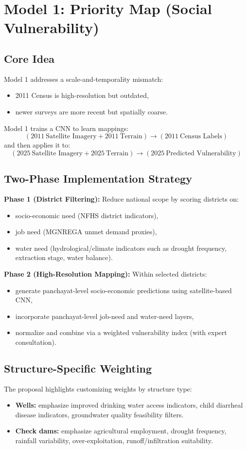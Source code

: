 \documentclass[12pt,a4paper]{report}
\begin{document}
\section{Model 1: Priority Map (Social Vulnerability)}
\subsection{Core Idea}
Model 1 addresses a scale-and-temporality mismatch:
\begin{itemize}
  \item 2011 Census is high-resolution but outdated,
  \item newer surveys are more recent but spatially coarse.
\end{itemize}
Model 1 trains a CNN to learn mappings:
\[
(2011~\text{Satellite Imagery} + 2011~\text{Terrain}) \rightarrow (2011~\text{Census Labels})
\]
and then applies it to:
\[
(2025~\text{Satellite Imagery} + 2025~\text{Terrain}) \rightarrow (2025~\text{Predicted Vulnerability})
\]

\subsection{Two-Phase Implementation Strategy}
\textbf{Phase 1 (District Filtering):} Reduce national scope by scoring districts on:
\begin{itemize}
  \item socio-economic need (NFHS district indicators),
  \item job need (MGNREGA unmet demand proxies),
  \item water need (hydrological/climate indicators such as drought frequency, extraction stage, water balance).
\end{itemize}

\textbf{Phase 2 (High-Resolution Mapping):} Within selected districts:
\begin{itemize}
  \item generate panchayat-level socio-economic predictions using satellite-based CNN,
  \item incorporate panchayat-level job-need and water-need layers,
  \item normalize and combine via a weighted vulnerability index (with expert consultation).
\end{itemize}

\subsection{Structure-Specific Weighting}
The proposal highlights customizing weights by structure type:
\begin{itemize}
  \item \textbf{Wells:} emphasize improved drinking water access indicators, child diarrheal disease indicators, groundwater quality feasibility filters.
  \item \textbf{Check dams:} emphasize agricultural employment, drought frequency, rainfall variability, over-exploitation, runoff/infiltration suitability.
\end{itemize}
\end{document}
